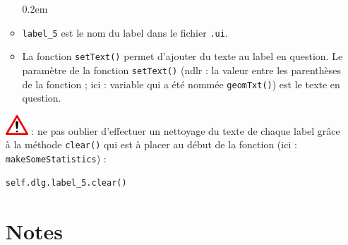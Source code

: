\documentclass[11pt]{article}
\begin{document}
\begin{enumerate}
\begin{itemize}\itemsep0.2em
\renewcommand\labelitemi{\---}
\item \og{}\texttt{label\_5}\fg{} est le nom du label dans le fichier \og{}\texttt{.ui}\fg{}. 
\item La fonction \og{}\texttt{setText()}\fg{} permet d'ajouter du texte au label en question. Le paramètre de la fonction \og{}\texttt{setText()}\fg{} (ndlr : la valeur entre les parenthèses de la fonction ; ici : variable qui a été nommée \og{}\texttt{geomTxt()}\fg{}) est le texte en question. 
\end{itemize}

\includegraphics[scale=1]{warningt.png} \underline{}: ne pas oublier d'effectuer un nettoyage du texte de chaque label grâce à la méthode \og{}\texttt{clear()}\fg{} qui est à placer au début de la fonction (ici : \og{}\texttt{makeSomeStatistics}\fg{}) :
\vspace*{-1em}
\begin{center}
\begin{minipage}[t]{0.30\textwidth}
\begin{verbatim}
self.dlg.label_5.clear()
\end{verbatim}
\end{minipage}
\end{center}


\section*{Notes}
\hrulefill
\vspace*{1.6em}

\hrulefill
\vspace*{1.6em}

\hrulefill
\vspace*{1.6em}

\hrulefill
\vspace*{1.6em}

\hrulefill
\vspace*{1.6em}

\hrulefill
\vspace*{1.6em}

\hrulefill
\vspace*{1.6em}


\end{enumerate}
\end{document}
